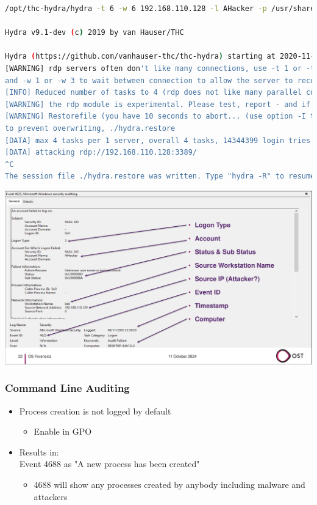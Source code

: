 \begin{lstlisting}[language=bash]
/opt/thc-hydra/hydra -t 6 -w 6 192.168.110.128 -l AHacker -p /usr/share/wordlists/rockyou.txt rdp

Hydra v9.1-dev (c) 2019 by van Hauser/THC

Hydra (https://github.com/vanhauser-thc/thc-hydra) starting at 2020-11-09 08:38:51
[WARNING] rdp servers often don't like many connections, use -t 1 or -t 4 to reduce the number of parallel connections
and -w 1 or -w 3 to wait between connection to allow the server to recover
[INFO] Reduced number of tasks to 4 (rdp does not like many parallel connections)
[WARNING] the rdp module is experimental. Please test, report - and if possible, fix.
[WARNING] Restorefile (you have 10 seconds to abort... (use option -I to skip waiting)) from a previous session found,
to prevent overwriting, ./hydra.restore
[DATA] max 4 tasks per 1 server, overall 4 tasks, 14344399 login tries (1:1/p:14344399), ~3586100 tries per task
[DATA] attacking rdp://192.168.110.128:3389/
^C
The session file ./hydra.restore was written. Type "hydra -R" to resume session.
\end{lstlisting}

\begin{center}
  \includegraphics[width=\textwidth]{resources/05-event-example.png}
\end{center}

\subsubsection*{Command Line Auditing}
\begin{itemize}
   \item Process creation is not logged by default
   \begin{itemize}
       \item Enable in GPO
   \end{itemize}
   \item Results in:\\
   Event 4688 as "A new process has been created"
   \begin{itemize}
       \item 4688 will show any processes created by anybody including malware and attackers
   \end{itemize}
\end{itemize}

